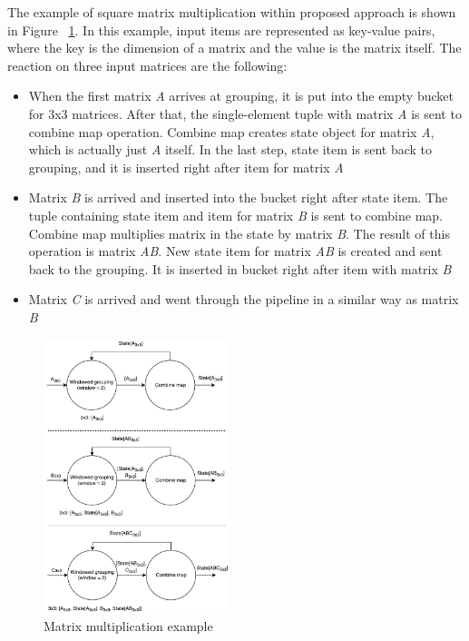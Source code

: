 The example of square matrix multiplication within proposed approach is shown in Figure ~\ref{matrix-example}. In this example, input items are represented as key-value pairs, where the key is the dimension of a matrix and the value is the matrix itself. The reaction on three input matrices are the following:


\begin{itemize}
    \item When the first matrix {\it A} arrives at grouping, it is put into the empty bucket for 3x3 matrices. After that, the single-element tuple with matrix {\it A} is sent to combine map operation. Combine map creates state object for matrix {\it A}, which is actually just {\it A} itself. In the last step, state item is sent back to grouping, and it is inserted right after item for matrix {\it A}
    \item Matrix {\it B} is arrived and inserted into the bucket right after state item. The tuple containing state item and item for matrix {\it B} is sent to combine map. Combine map multiplies matrix in the state by matrix {\it B}. The result of this operation is matrix {\it AB}. New state item for matrix {\it AB} is created and sent back to the grouping. It is inserted in bucket right after item with matrix {\it B}
    \item Matrix {\it C} is arrived and went through the pipeline in a similar way as matrix {\it B}
\end{itemize}

\begin{figure}[htbp]
  \centering
  \includegraphics[width=0.48\textwidth]{pics/matrix-example}
  \caption{Matrix multiplication example}
  \label {matrix-example}
\end{figure}

